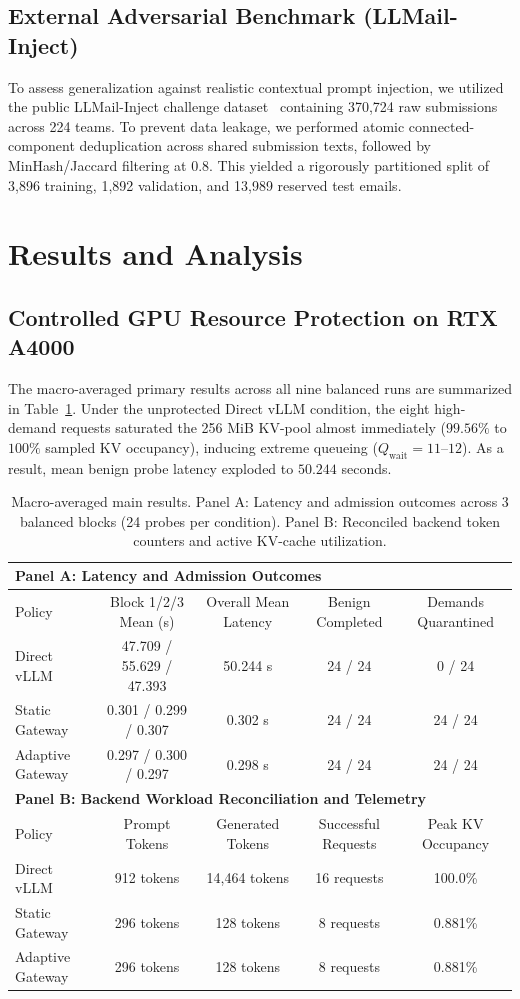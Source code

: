 \documentclass[runningheads]{article}
\begin{document}
\subsection{External Adversarial Benchmark (LLMail-Inject)}
To assess generalization against realistic contextual prompt injection, we utilized the public LLMail-Inject challenge dataset~\cite{abdelnabi2025llmail} containing 370,724 raw submissions across 224 teams. To prevent data leakage, we performed atomic connected-component deduplication across shared submission texts, followed by MinHash/Jaccard filtering at 0.8. This yielded a rigorously partitioned split of 3,896 training, 1,892 validation, and 13,989 reserved test emails.

\section{Results and Analysis}

\subsection{Controlled GPU Resource Protection on RTX A4000}
The macro-averaged primary results across all nine balanced runs are summarized in Table~\ref{tab:main_results}. Under the unprotected Direct vLLM condition, the eight high-demand requests saturated the 256 MiB KV-pool almost immediately ($99.56\%$ to $100\%$ sampled KV occupancy), inducing extreme queueing ($Q_{\text{wait}} = 11$--$12$). As a result, mean benign probe latency exploded to $50.244$ seconds.

\begin{table}[t]
\centering
\caption{Macro-averaged main results. Panel A: Latency and admission outcomes across 3 balanced blocks (24 probes per condition). Panel B: Reconciled backend token counters and active KV-cache utilization.}
\label{tab:main_results}
\small
\begin{tabular}{lcccc}
\toprule
\multicolumn{5}{l}{\textbf{Panel A: Latency and Admission Outcomes}} \\
\midrule
Policy & Block 1/2/3 Mean (s) & Overall Mean Latency & Benign Completed & Demands Quarantined \\
\midrule
Direct vLLM & 47.709 / 55.629 / 47.393 & 50.244 s & 24 / 24 & 0 / 24 \\
Static Gateway & 0.301 / 0.299 / 0.307 & 0.302 s & 24 / 24 & 24 / 24 \\
Adaptive Gateway & 0.297 / 0.300 / 0.297 & 0.298 s & 24 / 24 & 24 / 24 \\
\midrule
\multicolumn{5}{l}{\textbf{Panel B: Backend Workload Reconciliation and Telemetry}} \\
\midrule
Policy & Prompt Tokens & Generated Tokens & Successful Requests & Peak KV Occupancy \\
\midrule
Direct vLLM & 912 tokens & 14,464 tokens & 16 requests & 100.0\% \\
Static Gateway & 296 tokens & 128 tokens & 8 requests & 0.881\% \\
Adaptive Gateway & 296 tokens & 128 tokens & 8 requests & 0.881\% \\
\bottomrule
\end{tabular}
\end{table}
\end{document}
